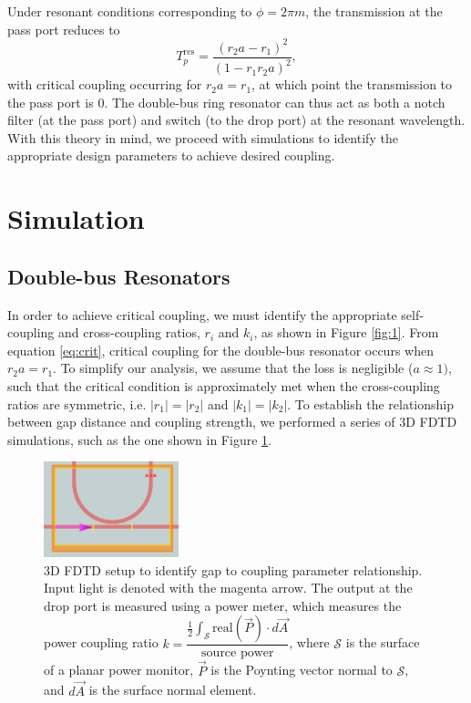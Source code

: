 \documentclass[letterpaper, 10 pt, conference]{ieeeconf}
\begin{document}
Under resonant conditions corresponding to $\phi = 2\pi m$, the transmission at the pass port reduces to 
\begin{equation}
    T_p^{\text{res}} = \dfrac{(r_2a-r_1)^2}{(1-r_1r_2a)^2},
    \label{eq:crit}
\end{equation}
with critical coupling occurring for $r_2a=r_1$, at which point the transmission to the pass port is $0$. The double-bus ring resonator can thus act as both a notch filter (at the pass port) and switch (to the drop port) at the resonant wavelength. With this theory in mind, we proceed with simulations to identify the appropriate design parameters to achieve desired coupling.


\section{Simulation}
\subsection*{Double-bus Resonators}
In order to achieve critical coupling, we must identify the appropriate self-coupling and cross-coupling ratios, $r_i$ and $k_i$, as shown in Figure \ref{fig:1}. From equation \eqref{eq:crit}, critical coupling for the double-bus resonator occurs when $r_2a = r_1$. To simplify our analysis, we assume that the loss is negligible ($a\approx 1)$, such that the critical condition is approximately met when the cross-coupling ratios are symmetric, i.e. $|r_1| = |r_2|$ and $|k_1| = |k_2|$. To establish the relationship between gap distance and coupling strength, we performed a series of 3D FDTD simulations, such as the one shown in Figure \ref{fig:sim3d}.

\begin{figure}[!ht]
    \centering
    \includegraphics[width = 0.35\textwidth]{gapdist.png}
    \caption{3D FDTD setup to identify gap to coupling parameter relationship. Input light is denoted with the magenta arrow. The output at the drop port is measured using a power meter, which measures the power coupling ratio $k =\dfrac{\frac{1}{2}\int_\mathcal{S}\text{real}(\vec{P})\cdot d\vec{A}}{\text{source power}}$, where $\mathcal{S}$ is the surface of a planar power monitor, $\vec{P}$ is the Poynting vector normal to $\mathcal{S}$, and $d\vec{A}$ is the surface normal element. }
    \label{fig:sim3d}
\end{figure} 
\end{document}
